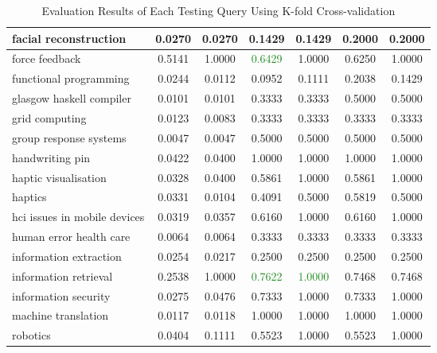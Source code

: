 \begin{table}
{\begin{tabular}{|l|c|c|c|c|c|c|}
\hline facial reconstruction & 0.0270 & 0.0270 & 0.1429 & 0.1429 & 0.2000 & 0.2000 \\
\hline force feedback & 0.5141 & 1.0000 & \textcolor{ForestGreen}{0.6429} & 1.0000 & 0.6250 & 1.0000 \\
\hline functional programming & 0.0244 & 0.0112 & 0.0952 & 0.1111 & 0.2038 & 0.1429 \\
\hline glasgow haskell compiler & 0.0101 & 0.0101 & 0.3333 & 0.3333 & 0.5000 & 0.5000 \\
\hline grid computing & 0.0123 & 0.0083 & 0.3333 & 0.3333 & 0.3333 & 0.3333 \\
\hline group response systems & 0.0047 & 0.0047 & 0.5000 & 0.5000 & 0.5000 & 0.5000 \\
\hline handwriting pin & 0.0422 & 0.0400 & 1.0000 & 1.0000 & 1.0000 & 1.0000 \\
\hline haptic visualisation & 0.0328 & 0.0400 & 0.5861 & 1.0000 & 0.5861 & 1.0000 \\
\hline haptics & 0.0331 & 0.0104 & 0.4091 & 0.5000 & 0.5819 & 0.5000 \\
\hline hci issues in mobile devices & 0.0319 & 0.0357 & 0.6160 & 1.0000 & 0.6160 & 1.0000 \\
\hline human error health care & 0.0064 & 0.0064 & 0.3333 & 0.3333 & 0.3333 & 0.3333 \\
\hline information extraction & 0.0254 & 0.0217 & 0.2500 & 0.2500 & 0.2500 & 0.2500 \\
\hline information retrieval & 0.2538 & 1.0000 & \textcolor{ForestGreen}{0.7622} & \textcolor{ForestGreen}{1.0000} & 0.7468 & 0.7468 \\
\hline information security & 0.0275 & 0.0476 & 0.7333 & 1.0000 & 0.7333 & 1.0000 \\
\hline machine translation & 0.0117 & 0.0118 & 1.0000 & 1.0000 & 1.0000 & 1.0000 \\
\hline robotics & 0.0404 & 0.1111 & 0.5523 & 1.0000 & 0.5523 & 1.0000 \\
\hline
\end{tabular}
}
\caption{Evaluation Results of Each Testing Query Using K-fold Cross-validation} \label{table:kfoldqueryresult}
\end{table}

